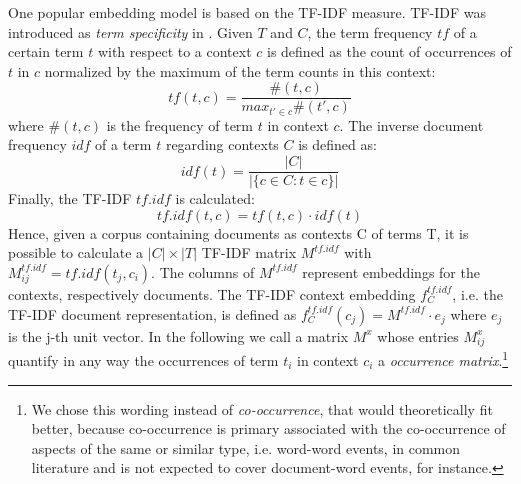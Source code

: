 One popular embedding model is based on the \ac{TF-IDF} measure. \ac{TF-IDF} was introduced as \textit{term specificity} in \textcite{sparck_jones_statistical_1972}. Given $T$ and $C$, the term frequency $tf$ of a certain term $t$ with respect to a context $c$ is defined as the count of occurrences of $t$ in $c$ normalized by the maximum of the term counts in this context:
\begin{equation}
tf(t, c) = \frac{\#(t, c)}{max_{t' \in c}\#(t', c)}
\end{equation}
where $\#(t,c)$ is the frequency of term $t$ in context $c$. The inverse document frequency $idf$ of a term $t$ regarding contexts $C$ is defined as:
\begin{equation}
idf(t) = \frac{|C|}{|\{c \in C: t \in c \}|}
\end{equation}
Finally, the \acl{TF-IDF} $tf.idf$ is calculated:
\begin{equation}
tf.idf(t, c) = tf(t, c) \cdot idf(t) %
\end{equation}
Hence, given a corpus containing documents as contexts C of terms T, it is possible to calculate a $|C| \times |T|$ %
\ac{TF-IDF} matrix $M^{tf.idf}$ with $M^{tf.idf}_{ij} = tf.idf(t_j, c_i)$. The columns of $M^{tf.idf}$ represent embeddings for the contexts, respectively documents. The \ac{TF-IDF} context embedding $f_C^{tf.idf}$, i.e. the \ac{TF-IDF} document representation, is defined as $f_C^{tf.idf} (c_j)= M^{tf.idf} \cdot e_j$ where $e_j$ is the j-th unit vector. In the following we call a matrix $M^x$ whose entries $M^x_{ij}$ quantify in any way the occurrences of term $t_i$ in context $c_i$ a \textit{occurrence matrix}.\footnote{We chose this wording instead of \textit{co-occurrence}, that would theoretically fit better, because co-occurrence is primary associated with the co-occurrence of aspects of the same or similar type, i.e. word-word events, in common literature and is not expected to cover document-word events, for instance. 
} 

